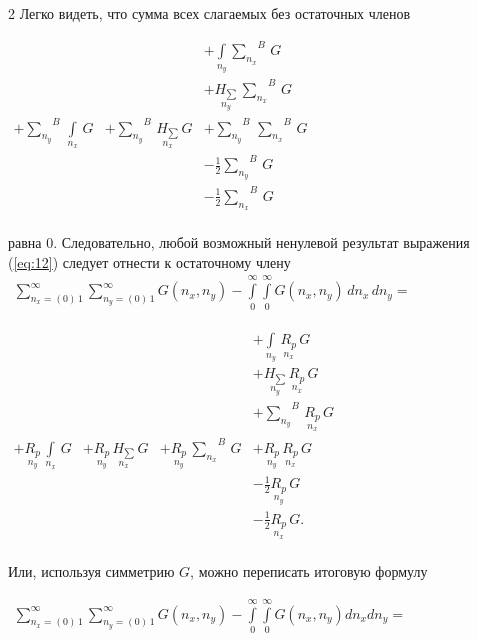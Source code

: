 \documentclass[twoside, 10pt]{article}
\begin{document}
\begin{multicols}{2}
    Легко видеть, что сумма всех слагаемых без остаточных членов

    \(\begin{array}{llll}  \,&  \,&  + \int\limits_{n_y}^{}{\sum\limits_{n_x}^{}}^{B}\,G \\  \,&  \,&  + \underset{n_y}{H_{\sum}}\,{\sum\limits_{n_x}^{}}^{B}\,G \\  + {\sum\limits_{n_y}^{}}^{B}\,\int\limits_{n_x}^{}\,G &  + {\sum\limits_{n_y}^{}}^{B}\,\underset{n_x}{H_{\sum}}\,G &  + {\sum\limits_{n_y}^{}}^{B}\,{\sum\limits_{n_x}^{}}^{B}\,G\\  \,&  \,&  - \frac{1}{2}{\sum\limits_{n_y}^{}}^{B}\,G \\  \,&  \,&  - \frac{1}{2}{\sum\limits_{n_x}^{}}^{B}\,G \\ \end{array}\)

    равна 0. Следовательно, любой возможный ненулевой результат выражения (\ref{eq:12}) следует отнести к остаточному члену
\noindent
    \(\begin{array}{r} \sum\limits_{n_x=\left(0\right)\,1}^{\infty} \sum\limits_{n_y=\left(0\right)\,1}^{\infty} G\left(n_x, n_y\right) - \int\limits_{0}^{\infty} \int\limits_{0}^{\infty} G\left(n_x, n_y\right)\,d{n_x}\,d{n_y} = \end{array}\)

    \(\begin{array}{llll}  \,&  \,&  \,&  + \int\limits_{n_y}^{}\,\underset{n_x}{R_{p}}\,G \\  \,&  \,&  \,&  + \underset{n_y}{H_{\sum}}\,\underset{n_x}{R_{p}}\,G \\  \,&  \,&  \,&  + {\sum\limits_{n_y}^{}}^{B}\,\underset{n_x}{R_{p}}\,G \\  + \underset{n_y}{R_{p}}\,\int\limits_{n_x}^{}\,G &  + \underset{n_y}{R_{p}}\,\underset{n_x}{H_{\sum}}\,G &  + \underset{n_y}{R_{p}}\,{\sum\limits_{n_x}^{}}^{B}\,G &  + \underset{n_y}{R_{p}}\,\underset{n_x}{R_{p}}\,G \\  \,&  \,&  \,&  - \frac{1}{2}\underset{n_y}{R_{p}}\,G \\  \,&  \,&  \,&  - \frac{1}{2}\underset{n_x}{R_{p}}\,G. \\ \end{array}\)

    Или, используя симметрию \(G\), можно переписать итоговую формулу

\noindent
    \(\begin{array}{r} \sum\limits_{n_x=\left(0\right)\,1}^{\infty} \sum\limits_{n_y=\left(0\right)\,1}^{\infty} G\left(n_x, n_y\right) - \int\limits_{0}^{\infty} \int\limits_{0}^{\infty} G\left(n_x, n_y\right) d{n_x} d{n_y} = \end{array}\)


\end{multicols}
\end{document}
